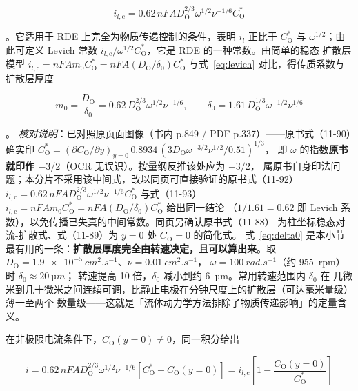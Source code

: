 \begin{equation}
i_{l,\mathrm{c}}=0.62\,nFAD_{\mathrm{O}}^{2/3}\omega^{1/2}\nu^{-1/6}C_{\mathrm{O}}^{*}
\label{eq:levich}
\end{equation}

。它适用于 RDE 上完全为物质传递控制的条件，表明
$i_l$ 正比于 $C_{\mathrm{O}}^{*}$ 与 $\omega^{1/2}$；由此可定义 Levich 常数
$i_{l,\mathrm{c}}/\omega^{1/2}C_{\mathrm{O}}^{*}$，它是 RDE 的一种常数。由简单的稳态
扩散层模型 $i_{l,\mathrm{c}}=nFAm_0C_{\mathrm{O}}^{*}=nFA(D_{\mathrm{O}}/\delta_0)
C_{\mathrm{O}}^{*}$ 与式~\eqref{eq:levich} 对比，得传质系数与扩散层厚度

\begin{equation}
m_0=\frac{D_{\mathrm{O}}}{\delta_0}
=0.62\,D_{\mathrm{O}}^{2/3}\omega^{1/2}\nu^{-1/6},
\qquad
\delta_0=1.61\,D_{\mathrm{O}}^{1/3}\omega^{-1/2}\nu^{1/6}
\label{eq:delta0}
\end{equation}

。
\emph{核对说明}：已对照原页面图像（书内 p.849 / PDF p.337）——原书式（11-90）确实印
$C_{\mathrm{O}}^{*}=(\partial C_{\mathrm{O}}/\partial y)_{y=0}\,0.8934\,(3D_{\mathrm{O}}\omega^{-3/2}\nu^{1/2}/0.51)^{1/3}$，
即 $\omega$ 的指数\textbf{原书就印作 $-3/2$}（OCR 无误识）。按量纲反推该处应为 $+3/2$，
属原书自身印法问题；本分片不采用该中间式，改以同页可直接验证的原书式（11-92）
$i_{l,\mathrm{c}}=0.62\,nFAD_{\mathrm{O}}^{2/3}\omega^{1/2}\nu^{-1/6}C_{\mathrm{O}}^{*}$ 与式（11-93）
$i_{l,\mathrm{c}}=nFAm_0C_{\mathrm{O}}^{*}=nFA(D_{\mathrm{O}}/\delta_0)C_{\mathrm{O}}^{*}$ 给出同一结论
（$1/1.61=0.62$ 即 Levich 系数），以免传播已失真的中间常数。同页另确认原书式（11-88）
为柱坐标稳态对流-扩散式、式（11-89）为 $y=0$ 处 $C_{\mathrm{O}}=0$ 的简化式。
式~\eqref{eq:delta0} 是本小节
最有用的一条：\textbf{扩散层厚度完全由转速决定，且可以算出来}。取
$D_{\mathrm{O}}=\qty{1.9e-5}{cm^2.s^{-1}}$、$\nu=\qty{0.01}{cm^2.s^{-1}}$，
$\omega=\qty{100}{rad.s^{-1}}$（约 \qty{955}{rpm}）时 $\delta_0\approx\qty{20}{µm}$；
转速提高 10 倍，$\delta_0$ 减小到约 \qty{6}{µm}。常用转速范围内 $\delta_0$ 在
几微米到几十微米之间连续可调，比静止电极在分钟尺度上的扩散层（可达毫米量级）薄一至两个
数量级——这就是「流体动力学方法排除了物质传递影响」的定量含义。

在非极限电流条件下，$C_{\mathrm{O}}(y=0)\ne0$，同一积分给出

\begin{equation}
i=0.62\,nFAD_{\mathrm{O}}^{2/3}\omega^{1/2}\nu^{-1/6}
\left[C_{\mathrm{O}}^{*}-C_{\mathrm{O}}(y=0)\right]
=i_{l,\mathrm{c}}\left[1-\frac{C_{\mathrm{O}}(y=0)}{C_{\mathrm{O}}^{*}}\right]
\label{eq:levich-general}
\end{equation}

